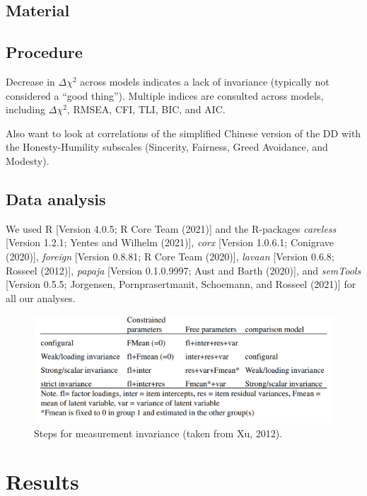 \documentclass[
  english,
  man]{apa6}
\begin{document}
\hypertarget{material}{%
\subsection{Material}\label{material}}

\hypertarget{procedure}{%
\subsection{Procedure}\label{procedure}}

Decrease in \(\Delta\chi^2\) across models indicates a lack of invariance (typically not considered a ``good thing''). Multiple indices are consulted across models, including \(\Delta\chi^2\), RMSEA, CFI, TLI, BIC, and AIC.

Also want to look at correlations of the simplified Chinese version of the DD with the Honesty-Humility subscales (Sincerity, Fairness, Greed Avoidance, and Modesty).

\hypertarget{data-analysis}{%
\subsection{Data analysis}\label{data-analysis}}

We used R {[}Version 4.0.5; R Core Team (2021){]} and the R-packages \emph{careless} {[}Version 1.2.1; Yentes and Wilhelm (2021){]}, \emph{corx} {[}Version 1.0.6.1; Conigrave (2020){]}, \emph{foreign} {[}Version 0.8.81; R Core Team (2020){]}, \emph{lavaan} {[}Version 0.6.8; Rosseel (2012){]}, \emph{papaja} {[}Version 0.1.0.9997; Aust and Barth (2020){]}, and \emph{semTools} {[}Version 0.5.5; Jorgensen, Pornprasertmanit, Schoemann, and Rosseel (2021){]} for all our analyses.

\begin{figure}
\includegraphics[width=4.71in]{steps} \caption{Steps for measurement invariance (taken from Xu, 2012).}\label{fig:figure1}
\end{figure}

\hypertarget{results}{%
\section{Results}\label{results}}
\end{document}
